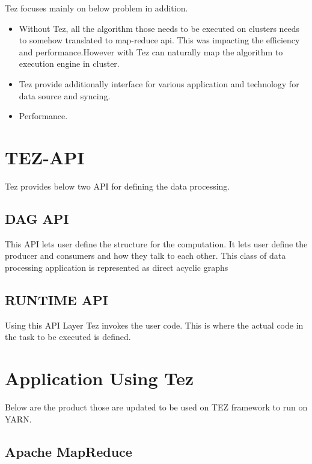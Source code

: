 \documentclass[9pt,twocolumn,twoside]{../../styles/osajnl}
\begin{document}
Tez focuses mainly on below problem in addition.

\begin{itemize}
\item Without Tez, all the algorithm those needs to be executed on clusters needs to somehow translated to map-reduce api. This was impacting the efficiency and performance.However with Tez can naturally map the algorithm to execution engine in cluster.
        
\item Tez provide additionally interface for various application and technology for data source and syncing.

\item Performance.
\end{itemize}	


\section{TEZ-API}

Tez provides below two API for defining the data processing. 

\subsection{ DAG API}
	This API lets user define the structure for the computation.
	It lets user define the producer and consumers and how they talk to each other.
	This class of data processing application is represented as direct acyclic graphs 	

\subsection{RUNTIME API}
 	
	Using this API Layer Tez invokes the user code. This is where the actual code in the task  
to be executed is defined.


\section{Application Using Tez}

     Below are the product those are updated to be used on TEZ framework to run on YARN.
 
               
\subsection{Apache MapReduce}
      
\end{document}

